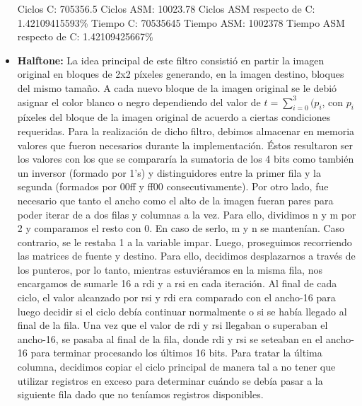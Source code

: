 \documentclass[10pt, a4paper]{article}
\begin{document}
\begin{itemize}
Ciclos C:                 705356.5\newline
Ciclos ASM:               10023.78\newline
Ciclos ASM respecto de C: 1.42109415593\% \newline
Tiempo C:                 70535645\newline
Tiempo ASM:               1002378\newline
Tiempo ASM respecto de C: 1.42109425667\% \newline

\item {\textbf{Halftone:}}
La idea principal de este filtro consistió en partir la imagen original en bloques de 2x2 píxeles generando, en la imagen destino, bloques del mismo tamaño. A cada nuevo bloque de la imagen original se le debió asignar el color blanco o negro dependiendo del valor de $t = \sum_{i=0}^{3} {(p_{i}}$, con $p_{i}$ píxeles del bloque de la imagen original de acuerdo a ciertas condiciones requeridas.\newline
Para la realización de dicho filtro, debimos almacenar en memoria valores que fueron necesarios durante la implementación. Éstos resultaron ser los valores con los que se compararía la sumatoria de los 4 bits como también un inversor (formado por 1's) y distinguidores entre la primer fila y la segunda (formados por 00ff y ff00 consecutivamente).\newline 
Por otro lado, fue necesario que tanto el ancho como el alto de la imagen fueran pares para poder iterar de a dos filas y columnas a la vez. Para ello, dividimos n y m por 2 y comparamos el resto con 0. En caso de serlo, m y n se mantenían. Caso contrario, se le restaba 1 a la variable impar.\newline
Luego, proseguimos recorriendo las matrices de fuente y destino. Para ello, decidimos desplazarnos a través de los punteros, por lo tanto, mientras estuviéramos en la misma fila, nos encargamos de sumarle 16 a rdi y a rsi en cada iteración. Al final de cada ciclo, el valor alcanzado por rsi y rdi era comparado con el ancho-16 para luego decidir si el ciclo debía continuar normalmente o si se había llegado al final de la fila. Una vez que el valor de rdi y rsi llegaban o superaban el ancho-16, se pasaba al final de la fila, donde rdi y rsi se seteaban en el ancho-16 para terminar procesando los últimos 16 bits. Para tratar la última columna, decidimos copiar el ciclo principal de manera tal a no tener que utilizar registros en exceso para determinar cuándo se debía pasar a la siguiente fila dado que no teníamos registros disponibles.\newline

\end{itemize}
\end{document}
